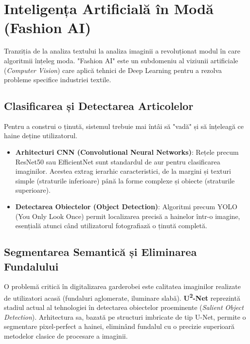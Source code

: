 \section{Inteligența Artificială în Modă (Fashion AI)}
\label{sec:ai_fashion}

Tranziția de la analiza textului la analiza imaginii a revoluționat modul în care algoritmii înțeleg moda. "Fashion AI" este un subdomeniu al viziunii artificiale (\textit{Computer Vision}) care aplică tehnici de Deep Learning pentru a rezolva probleme specifice industriei textile.

\subsection{Clasificarea și Detectarea Articolelor}
Pentru a construi o ținută, sistemul trebuie mai întâi să "vadă" și să înțeleagă ce haine deține utilizatorul.
\begin{itemize}
    \item \textbf{Arhitecturi CNN (Convolutional Neural Networks)}: Rețele precum ResNet50 \cite{he2016deep} sau EfficientNet \cite{tan2019efficientnet} sunt standardul de aur pentru clasificarea imaginilor. Acestea extrag ierarhic caracteristici, de la margini și texturi simple (straturile inferioare) până la forme complexe și obiecte (straturile superioare).
    \item \textbf{Detectarea Obiectelor (Object Detection)}: Algoritmi precum YOLO (You Only Look Once) \cite{redmon2016you} permit localizarea precisă a hainelor într-o imagine, esențială atunci când utilizatorul fotografiază o ținută completă.
\end{itemize}

\subsection{Segmentarea Semantică și Eliminarea Fundalului}
O problemă critică în digitalizarea garderobei este calitatea imaginilor realizate de utilizatori acasă (fundaluri aglomerate, iluminare slabă).
\textbf{U\textsuperscript{2}-Net} \cite{qin2020u2net} reprezintă stadiul actual al tehnologiei în detectarea obiectelor proeminente (\textit{Salient Object Detection}). Arhitectura sa, bazată pe structuri imbricate de tip U-Net, permite o segmentare pixel-perfect a hainei, eliminând fundalul cu o precizie superioară metodelor clasice de procesare a imaginii.

